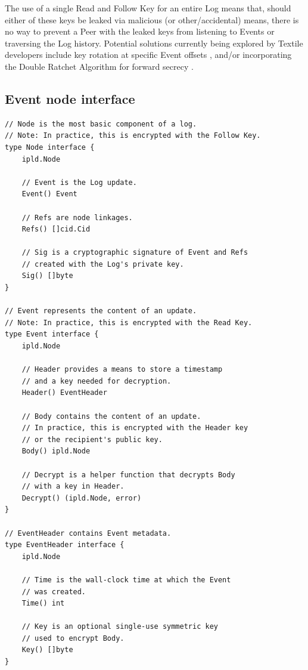 \documentclass{textile}
\begin{document}
The use of a single Read and Follow Key for an entire Log means that, should either of these keys be leaked via malicious (or other/accidental) means, there is no way to prevent a Peer with the leaked keys from listening to Events or traversing the Log history. Potential solutions currently being explored by Textile developers include key rotation at specific Event offsets \cite{hashicorpKeyRotation}, and/or incorporating the Double Ratchet Algorithm \cite{marlinspikeDoubleRatchetAlgorithm2016} for forward secrecy \cite{ungerSoKSecureMessaging2015}.


\nocite{*}

\printbibliography

\appendix

\begin{example*}[!p]
\section{Event node interface} \label{appx:EventNode} %
\begin{lstlisting}
// Node is the most basic component of a log.
// Note: In practice, this is encrypted with the Follow Key.
type Node interface {
    ipld.Node

    // Event is the Log update.
    Event() Event

    // Refs are node linkages.
    Refs() []cid.Cid

    // Sig is a cryptographic signature of Event and Refs
    // created with the Log's private key.
    Sig() []byte
}

// Event represents the content of an update.
// Note: In practice, this is encrypted with the Read Key.
type Event interface {
    ipld.Node

    // Header provides a means to store a timestamp
    // and a key needed for decryption.
    Header() EventHeader

    // Body contains the content of an update.
    // In practice, this is encrypted with the Header key
    // or the recipient's public key.
    Body() ipld.Node

    // Decrypt is a helper function that decrypts Body
    // with a key in Header.
    Decrypt() (ipld.Node, error)
}

// EventHeader contains Event metadata.
type EventHeader interface {
    ipld.Node

    // Time is the wall-clock time at which the Event
    // was created.
    Time() int

    // Key is an optional single-use symmetric key
    // used to encrypt Body.
    Key() []byte
}
\end{lstlisting} 
\end{example*} 
\end{document}
